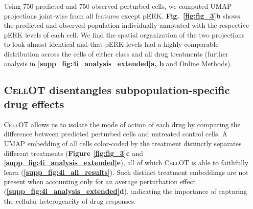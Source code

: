 Using 750 predicted and 750 observed perturbed cells, we computed UMAP projections joint-wise from all features except pERK. \textbf{Fig.~\ref{fig:fig_3}b} shows the predicted and observed population individually annotated with the respective pERK levels of each cell. We find the spatial organization of the two projections to look almost identical and that pERK levels had a highly comparable distribution across the cells of either class and all drug treatments (further analysis in \textbf{\ref{supp_fig:4i_analysis_extended}a, b} and Online Methods).


\subsection*{\textsc{CellOT} disentangles subpopulation-specific drug effects}
\textsc{CellOT} allows us to 
isolate the mode of action of each drug by computing the difference between predicted perturbed cells and untreated control cells. %
A UMAP embedding of all cells color-coded by the treatment distinctly separates different treatments (\textbf{Figure \ref{fig:fig_3}c} and \textbf{\ref{supp_fig:4i_analysis_extended}e}), all of which \textsc{CellOT} is able to faithfully learn (\textbf{\ref{supp_fig:4i_all_results}}).
Such distinct treatment embeddings are not present when accounting only for an average perturbation effect (\textbf{\ref{supp_fig:4i_analysis_extended}d}), indicating the importance of capturing the cellular heterogeneity of drug responses.

